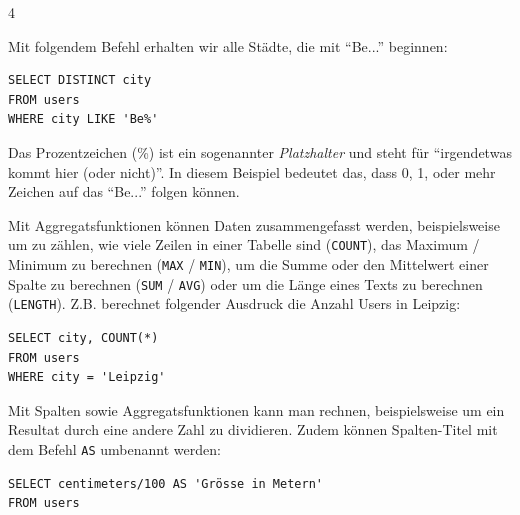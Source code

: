 \begin{landscape}
\begin{multicols*}{4}
\begin{cheatSheetBox}[title=Ungefähre Treffer: \texorpdfstring{\lstinline|LIKE|}{LIKE}]
Mit folgendem Befehl erhalten wir alle Städte, die mit ``Be...'' beginnen:
\begin{lstlisting}
SELECT DISTINCT city 
FROM users 
WHERE city LIKE 'Be%'
\end{lstlisting}
Das Prozentzeichen (\%) ist ein sogenannter \textit{Platzhalter} und steht für \enquote{irgendetwas kommt hier (oder nicht)}. In diesem Beispiel bedeutet das, dass 0, 1, oder mehr Zeichen auf das \enquote{Be...} folgen können.
\end{cheatSheetBox}
%
\begin{cheatSheetBox}[title=Aggregatsfunktionen]
Mit Aggregatsfunktionen können Daten zusammengefasst werden, beispielsweise um zu zählen, wie viele Zeilen in einer Tabelle sind (\lstinline|COUNT|), das Maximum / Minimum zu berechnen (\lstinline|MAX| / \lstinline|MIN|), um die Summe oder den Mittelwert einer Spalte zu berechnen (\lstinline|SUM| / \lstinline|AVG|) oder um die Länge eines Texts zu berechnen (\lstinline|LENGTH|). Z.B. berechnet folgender Ausdruck die Anzahl Users in Leipzig:
\begin{lstlisting}
SELECT city, COUNT(*)
FROM users 
WHERE city = 'Leipzig'
\end{lstlisting}
\end{cheatSheetBox}

\begin{cheatSheetBox}[title=Rechnen und umbenennen: \texorpdfstring{\lstinline|AS|}{AS}]
Mit Spalten sowie Aggregatsfunktionen kann man rechnen, beispielsweise um ein Resultat durch eine andere Zahl zu dividieren. Zudem können Spalten-Titel mit dem Befehl \lstinline|AS| umbenannt werden:
\begin{lstlisting}
SELECT centimeters/100 AS 'Grösse in Metern'
FROM users 
\end{lstlisting}
\end{cheatSheetBox}


\end{multicols*}
\end{landscape}
